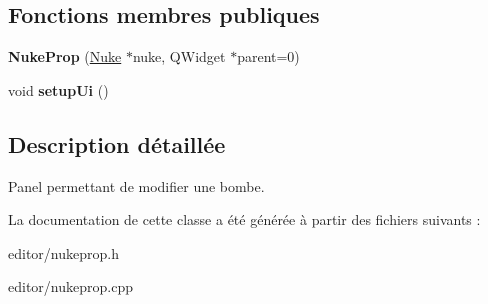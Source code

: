 \subsection*{Fonctions membres publiques}
\begin{DoxyCompactItemize}
\item 
\hypertarget{classNukeProp_a2e11beb43353c8ccbdfe1d8ba7eb61a6}{{\bfseries Nuke\+Prop} (\hyperlink{classNuke}{Nuke} $\ast$nuke, Q\+Widget $\ast$parent=0)}\label{classNukeProp_a2e11beb43353c8ccbdfe1d8ba7eb61a6}

\item 
\hypertarget{classNukeProp_a4f9fd54eecaba08172d134599908ecf9}{void {\bfseries setup\+Ui} ()}\label{classNukeProp_a4f9fd54eecaba08172d134599908ecf9}

\end{DoxyCompactItemize}


\subsection{Description détaillée}
Panel permettant de modifier une bombe. 

La documentation de cette classe a été générée à partir des fichiers suivants \+:\begin{DoxyCompactItemize}
\item 
editor/nukeprop.\+h\item 
editor/nukeprop.\+cpp\end{DoxyCompactItemize}
